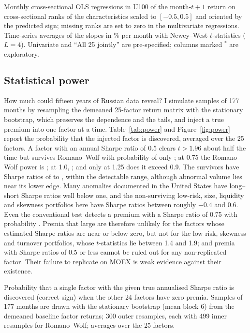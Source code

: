 \documentclass[11pt]{article}
\newcommand{\tabnote}[1]{\par\vspace{3pt}\begin{minipage}{\linewidth}\footnotesize\setstretch{1.0}#1\end{minipage}}
\newcommand{\RW}{Romano--Wolf}
\begin{document}
\begin{table}[!htbp]
\centering\small
\caption{Fama--MacBeth regressions}\label{tab:fm}
\resizebox{\linewidth}{!}{}
\tabnote{Monthly cross-sectional OLS regressions in U100 of the month-$t+1$ return on cross-sectional ranks of the
characteristics scaled to $[-0.5,0.5]$ and oriented by the predicted sign; missing ranks are set to zero in the
multivariate regressions. Time-series averages of the slopes in \% per month with Newey--West $t$-statistics ($L=4$).
Univariate and ``All 25 jointly'' are pre-specified; columns marked $^\ast$ are exploratory.}
\end{table}

\subsection{Statistical power}

How much could fifteen years of Russian data reveal? I simulate samples of 177 months by resampling the demeaned
25-factor return matrix with the stationary bootstrap, which preserves the dependence and the tails, and inject a true
premium into one factor at a time. Table~\ref{tab:power} and Figure~\ref{fig:power} report the probability that the
injected factor is discovered, averaged over the 25 factors. A factor with an annual Sharpe ratio of 0.5 clears
$t>1.96$ about half the time but survives \RW{} with probability of only ; at 0.75 the \RW{} power is
; at 1.0, ; and only at 1.25 does it exceed 0.9. The survivors have Sharpe ratios of
 to , within the detectable range, although abnormal volume lies near its lower edge.
Many anomalies documented in the United States have long--short Sharpe ratios well below one, and the non-surviving
low-risk, size, liquidity and skewness portfolios here have Sharpe ratios between roughly $-0.4$ and $0.6$. Even the
conventional test detects a premium with a Sharpe ratio of 0.75 with probability . Premia that large
are therefore unlikely for the factors whose estimated Sharpe ratios are near or below zero, but not for the low-risk,
skewness and turnover portfolios, whose $t$-statistics lie between 1.4 and 1.9; and premia with Sharpe ratios of 0.5 or
less cannot be ruled out for any non-replicated factor. Their failure to replicate on MOEX is weak evidence against their
existence.

\begin{table}[!htbp]
\centering\small
\caption{Power of the ladder}\label{tab:power}

\tabnote{Probability that a single factor with the given true annualised Sharpe ratio is discovered (correct sign) when the
other 24 factors have zero premia. Samples of 177 months are drawn with the stationary bootstrap (mean block 6) from the
demeaned baseline factor returns; 300 outer resamples, each with 499 inner resamples for \RW{}; averages over the 25
factors.}
\end{table}
\end{document}
